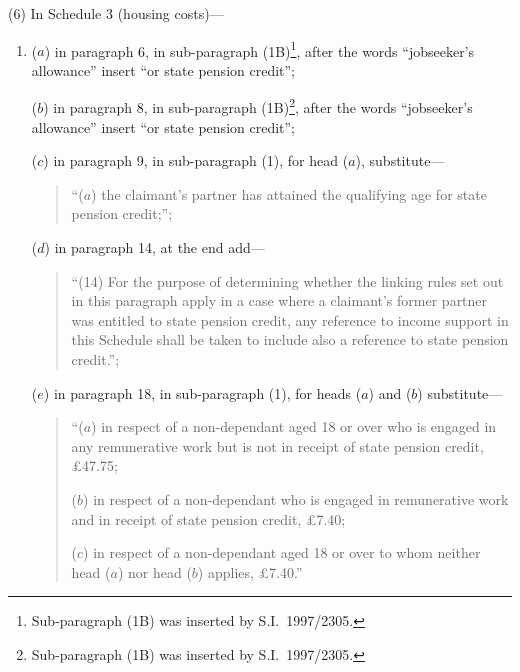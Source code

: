 \documentclass[12pt,a4paper]{article}
\begin{document}
(6) In Schedule 3 (housing costs)—
\begin{enumerate}\item[]
($a$) in paragraph 6, in sub-paragraph (1B)\footnote{Sub-paragraph (1B) was inserted by S.I.\ 1997/2305.}, after the words “jobseeker’s allowance” insert “or state pension credit”;

($b$) in paragraph 8, in sub-paragraph (1B)\footnote{Sub-paragraph (1B) was inserted by S.I.\ 1997/2305.}, after the words “jobseeker’s allowance” insert “or state pension credit”;

($c$) in paragraph 9, in sub-paragraph (1), for head ($a$), substitute—
\begin{quotation}
“($a$) the claimant’s partner has attained the qualifying age for state pension credit;”;
\end{quotation}

($d$) in paragraph 14, at the end add—
\begin{quotation}
“(14) For the purpose of determining whether the linking rules set out in this paragraph apply in a case where a claimant’s former partner was entitled to state pension credit, any reference to income support in this Schedule shall be taken to include also a reference to state pension credit.”;
\end{quotation}

($e$) in paragraph 18, in sub-paragraph (1), for heads ($a$)  and ($b$)  substitute—
\begin{quotation}
“($a$) in respect of a non-dependant aged 18 or over who is engaged in any remunerative work but is not in receipt of state pension credit, £47$.$75;

($b$) in respect of a non-dependant who is engaged in remunerative work and in receipt of state pension credit, £7$.$40;

($c$) in respect of a non-dependant aged 18 or over to whom neither head ($a$)  nor head ($b$)  applies, £7$.$40.”
\end{quotation}
\end{enumerate}
\end{document}
